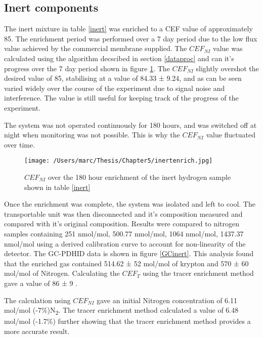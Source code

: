 \subsection{Inert components}\label{inertsec}
The inert mixture in table \ref{inert} was enriched to a CEF value of approximately 85. The enrichment period was performed over a 7 day period due to the low flux value achieved by the commercial membrane supplied. The $CEF_{NI}$ value was calculated using the algorithm decscibed in section \ref{dataproc} and can it's progress over the 7 day period shown in figure \ref{GCNI}. The $CEF_{NI}$ slightly overshot the desired value of 85, stabilising at a value of 84.33 ± 9.24, and as can be seen varied widely over the course of the experiment due to signal noise and interference. The value is still useful for keeping track of the progress of the experiment. 

The system was not operated continuously for 180 hours, and was switched off at night when monitoring was not possible. This is why the $CEF_{NI}$ value fluctuated over time. 

\begin{landscape}
    \begin{figure}
        \centering
        \texttt{[image: /Users/marc/Thesis/Chapter5/inertenrich.jpg]}
        \caption{$CEF_{NI}$ over the 180 hour enrichment of the inert hydrogen sample shown in table \ref{inert}}
        \label{GCNI}
    \end{figure}
\end{landscape}

Once the enrichment was complete, the system was isolated and left to cool. The transportable unit was then disconnected and it's composition measured and compared with it's original composition. Results were compared to nitrogen samples containing 251 nmol/mol, 500.77 nmol/mol, 1064 nmol/mol, 1437.37 nmol/mol using a derived calibration curve to account for non-linearity of the detector. The GC-PDHID data is shown in figure \ref{GCinert}. This analysis found that the enriched gas contained 514.62 ± 52 \textmu mol/mol of krypton and 570 ± 60 \textmu mol/mol of Nitrogen. Calculating the $CEF_T$ using the tracer enrichment method gave a value of 86 ± 9 . 

The calculation using $CEF_{NI}$ gave an initial Nitrogen concentration of 6.11 \textmu mol/mol (-7\%)N\textsubscript{2}. The tracer enrichment method calculated a value of 6.48 \textmu mol/mol (-1.7\%) further showing that the tracer enrichment method provides a more accurate result. 

